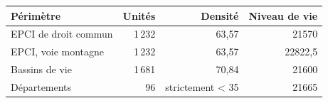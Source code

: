 \begin{tabularx}{\linewidth}{Xrrr}
\toprule
Périmètre & Unités & Densité & Niveau de vie \\
\midrule
EPCI de droit commun & 1\,232 & 63,57 & 21570 \\
EPCI, voie montagne & 1\,232 & 63,57 & 22822,5 \\
Bassins de vie & 1\,681 & 70,84 & 21600 \\
Départements & 96 & strictement < 35 & 21665 \\
\bottomrule
\end{tabularx}
